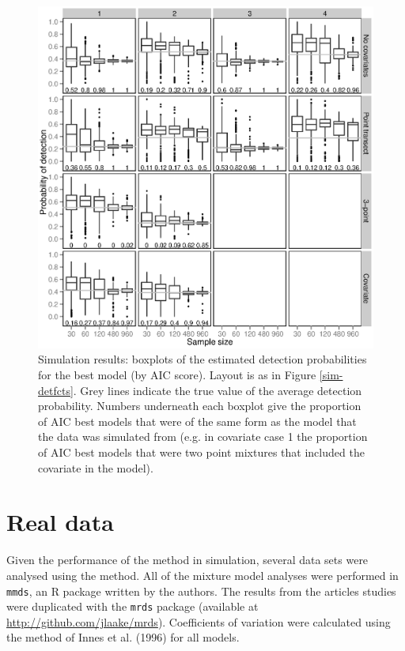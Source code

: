 \documentclass[useAMS,referee, usegraphicx]{biom}
\begin{document}
\begin{figure}
\centering
\includegraphics[width=\textwidth]{simulations/pa-plot.eps}
\caption{Simulation results: boxplots of the estimated detection probabilities for the best model (by AIC score). Layout is as in Figure \ref{sim-detfcts}. Grey lines indicate the true value of the average detection probability. Numbers underneath each boxplot give the proportion of AIC best models that were of the same form as the model that the data was simulated from (e.g. in covariate case 1 the proportion of AIC best models that were two point mixtures that included the covariate in the model).}
\label{sim-boxplots}
\end{figure}


\section{Real data}
\label{s:data}

Given the performance of the method in simulation, several data sets were analysed using the method. All of the mixture model analyses were performed in \texttt{mmds}, an \textsf{R} package written by the authors. The results from the articles studies were duplicated with the \texttt{mrds} package (available at \url{http://github.com/jlaake/mrds}). Coefficients of variation were calculated using the method of Innes et al. (1996) for all models.
\end{document}
